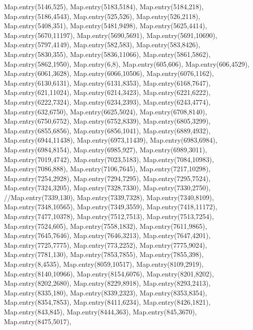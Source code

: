     Map.entry(5146,525),
    Map.entry(5183,5184),
    Map.entry(5184,218),
    Map.entry(5186,4543),
    Map.entry(525,526),
    Map.entry(526,2118),
    Map.entry(5408,351),
    Map.entry(5481,9498),
    Map.entry(5625,4414),
    Map.entry(5670,11197),
    Map.entry(5690,5691),
    Map.entry(5691,10690),
    Map.entry(5797,4149),
    Map.entry(582,583),
    Map.entry(583,8426),
    Map.entry(5830,355),
    Map.entry(5836,11066),
    Map.entry(5861,5862),
    Map.entry(5862,1950),
    Map.entry(6,8),
    Map.entry(605,606),
    Map.entry(606,4529),
    Map.entry(6061,3628),
    Map.entry(6066,10506),
    Map.entry(6076,1162),
    Map.entry(6130,6131),
    Map.entry(6131,8353),
    Map.entry(6168,7647),
    Map.entry(621,11024),
    Map.entry(6214,3423),
    Map.entry(6221,6222),
    Map.entry(6222,7324),
    Map.entry(6234,2393),
    Map.entry(6243,4774),
    Map.entry(632,6750),
    Map.entry(6625,5024),
    Map.entry(6708,8140),
    Map.entry(6750,6752),
    Map.entry(6752,8339),
    Map.entry(6805,3299),
    Map.entry(6855,6856),
    Map.entry(6856,1041),
    Map.entry(6889,4932),
    Map.entry(6944,11438),
    Map.entry(6973,11439),
    Map.entry(6983,6984),
    Map.entry(6984,8154),
    Map.entry(6985,927),
    Map.entry(6989,3011),
    Map.entry(7019,4742),
    Map.entry(7023,5183),
    Map.entry(7084,10983),
    Map.entry(7086,888),
    Map.entry(7106,7645),
    Map.entry(7217,10298),
    Map.entry(7254,2928),
    Map.entry(7294,7295),
    Map.entry(7295,7524),
    Map.entry(7324,3205),
    Map.entry(7328,7330),
    Map.entry(7330,2750),
    //Map.entry(7339,130),
    Map.entry(7339,7328),
    Map.entry(7340,8109),
    Map.entry(7348,10565),
    Map.entry(7349,3559),
    Map.entry(7418,11172),
    Map.entry(7477,10378),
    Map.entry(7512,7513),
    Map.entry(7513,7254),
    Map.entry(7524,605),
    Map.entry(7558,1832),
    Map.entry(7611,9865),
    Map.entry(7645,7646),
    Map.entry(7646,3213),
    Map.entry(7647,4201),
    Map.entry(7725,7775),
    Map.entry(773,2252),
    Map.entry(7775,9024),
    Map.entry(7781,130),
    Map.entry(7853,7855),
    Map.entry(7855,398),
    Map.entry(8,4535),
    Map.entry(8059,10517),
    Map.entry(8109,2919),
    Map.entry(8140,10966),
    Map.entry(8154,6076),
    Map.entry(8201,8202),
    Map.entry(8202,2680),
    Map.entry(8229,8918),
    Map.entry(8293,2413),
    Map.entry(8335,180),
    Map.entry(8339,2323),
    Map.entry(8353,8354),
    Map.entry(8354,7853),
    Map.entry(8411,6234),
    Map.entry(8426,1821),
    Map.entry(843,845),
    Map.entry(8444,363),
    Map.entry(845,3670),
    Map.entry(8475,5017),

